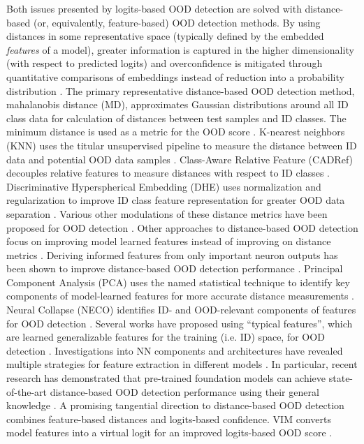 Both issues presented by logits-based OOD detection are solved with distance-based (or, equivalently, feature-based) OOD detection methods. By using distances in some representative space (typically defined by the embedded \emph{features} of a model), greater information is captured in the higher dimensionality (with respect to predicted logits) and overconfidence is mitigated through quantitative comparisons of embeddings instead of reduction into a probability distribution \cite{lee2018simple}. The primary representative distance-based OOD detection method, mahalanobis distance (MD), approximates Gaussian distributions around all ID class data for calculation of distances between test samples and ID classes. The minimum distance is used as a metric for the OOD score \cite{lee2018simple}. K-nearest neighbors (KNN) uses the titular unsupervised pipeline to measure the distance between ID data and potential OOD data samples \cite{sun2022out}. Class-Aware Relative Feature (CADRef) decouples relative features to measure distances with respect to ID classes \cite{ling2025cadref}. Discriminative Hyperspherical Embedding (DHE) uses normalization and regularization to improve ID class feature representation for greater OOD data separation \cite{zou2025provable}. Various other modulations of these distance metrics have been proposed for OOD detection \cite{ren2021simple,mendes2017nearest}. Other approaches to distance-based OOD detection focus on improving model learned features instead of improving on distance metrics \cite{kamkari2024geometric,guan2024exploiting,mirzaeiadversarially,li2024setar}. Deriving informed features from only important neuron outputs has been shown to improve distance-based OOD detection performance \cite{olber2023detection,ahn2023line,dong2022neural}. Principal Component Analysis (PCA) uses the named statistical technique to identify key components of model-learned features for more accurate distance measurements \cite{guan2023revisit,fang2024kernel}. Neural Collapse (NECO) identifies ID- and OOD-relevant components of features for OOD detection \cite{ammar2024neco,wupursuing}. Several works have proposed using ``typical features'', which are learned generalizable features for the training (i.e. ID) space, for OOD detection \cite{zhu2022boosting,he2024exploring}. Investigations into NN components and architectures have revealed multiple strategies for feature extraction in different models \cite{abdelzad2019detecting,gunther2017toward,yang2025oodd}. In particular, recent research has demonstrated that pre-trained foundation models can achieve state-of-the-art distance-based OOD detection performance using their general knowledge \cite{fort2021exploring}. A promising tangential direction to distance-based OOD detection combines feature-based distances and logits-based confidence. VIM converts model features into a virtual logit for an improved logits-based OOD score \cite{wang2022vim}.

